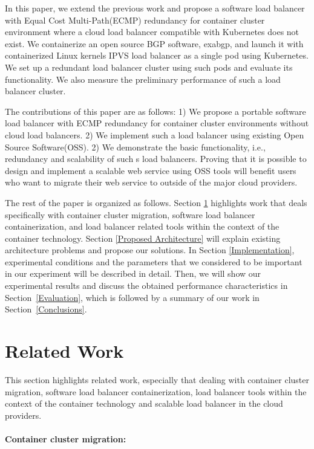In this paper, we extend the previous work and propose a software load balancer with Equal Cost Multi-Path(ECMP)\cite{thaler2000multipath} redundancy for container cluster environment where a cloud load balancer compatible with Kubernetes does not exist.
We containerize an open source BGP software, exabgp\cite{exa-networks_2018}, and launch it with containerized Linux kernels IPVS load balancer as a single pod using Kubernetes.
We set up a redundant load balancer cluster using such pods and evaluate its functionality.
We also measure the preliminary performance of such a load balancer cluster.

The contributions of this paper are as follows:
1) We propose a portable software load balancer with ECMP redundancy for container cluster environments without cloud load balancers.
2) We implement such a load balancer using existing Open Source Software(OSS).
2) We demonstrate the basic functionality, i.e., redundancy and scalability of such s load balancers.
Proving that it is possible to design and implement a scalable web service using OSS tools will benefit users who want to migrate their web service to outside of the major cloud providers.

The rest of the paper is organized as follows.
Section \ref{Related Work} highlights work that deals specifically with container cluster migration,
software load balancer containerization, and load balancer related tools within the context of the container technology.
Section \ref{Proposed Architecture} will explain existing architecture problems and propose our solutions.
In Section \ref{Implementation}, experimental conditions and the parameters
that we considered to be important in our experiment will be described in detail.
Then, we will show our experimental results and discuss the obtained performance characteristics in Section~\ref{Evaluation}, which is followed by a summary of our work in Section~\ref{Conclusions}.

\section{Related Work}\label{Related Work}

This section highlights related work, especially that dealing with container cluster migration, 
software load balancer containerization, load balancer tools within the context of the container technology and scalable load balancer in the cloud providers.

\paragraph{\bf Container cluster migration:}

